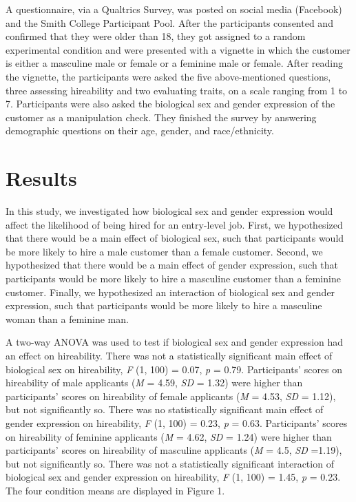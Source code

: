 \documentclass[english,man]{apa6}
\theoremstyle{definition}
\theoremstyle{definition}
\theoremstyle{remark}
\begin{document}
A questionnaire, via a Qualtrics Survey, was posted on social media
(Facebook) and the Smith College Participant Pool. After the
participants consented and confirmed that they were older than 18, they
got assigned to a random experimental condition and were presented with
a vignette in which the customer is either a masculine male or female or
a feminine male or female. After reading the vignette, the participants
were asked the five above-mentioned questions, three assessing
hireability and two evaluating traits, on a scale ranging from 1 to 7.
Participants were also asked the biological sex and gender expression of
the customer as a manipulation check. They finished the survey by
answering demographic questions on their age, gender, and
race/ethnicity.

\section{Results}\label{results}

In this study, we investigated how biological sex and gender expression
would affect the likelihood of being hired for an entry-level job.
First, we hypothesized that there would be a main effect of biological
sex, such that participants would be more likely to hire a male customer
than a female customer. Second, we hypothesized that there would be a
main effect of gender expression, such that participants would be more
likely to hire a masculine customer than a feminine customer. Finally,
we hypothesized an interaction of biological sex and gender expression,
such that participants would be more likely to hire a masculine woman
than a feminine man.

A two-way ANOVA was used to test if biological sex and gender expression
had an effect on hireability. There was not a statistically significant
main effect of biological sex on hireability, \emph{F} (1, 100) = 0.07,
\emph{p} = 0.79. Participants' scores on hireability of male applicants
(\emph{M} = 4.59, \emph{SD} = 1.32) were higher than participants'
scores on hireability of female applicants (\emph{M} = 4.53, \emph{SD} =
1.12), but not significantly so. There was no statistically significant
main effect of gender expression on hireability, \emph{F} (1, 100) =
0.23, \emph{p} = 0.63. Participants' scores on hireability of feminine
applicants (\emph{M} = 4.62, \emph{SD} = 1.24) were higher than
participants' scores on hireability of masculine applicants (\emph{M} =
4.5, \emph{SD} =1.19), but not significantly so. There was not a
statistically significant interaction of biological sex and gender
expression on hireability, \emph{F} (1, 100) = 1.45, \emph{p} = 0.23.
The four condition means are displayed in Figure 1.
\end{document}
